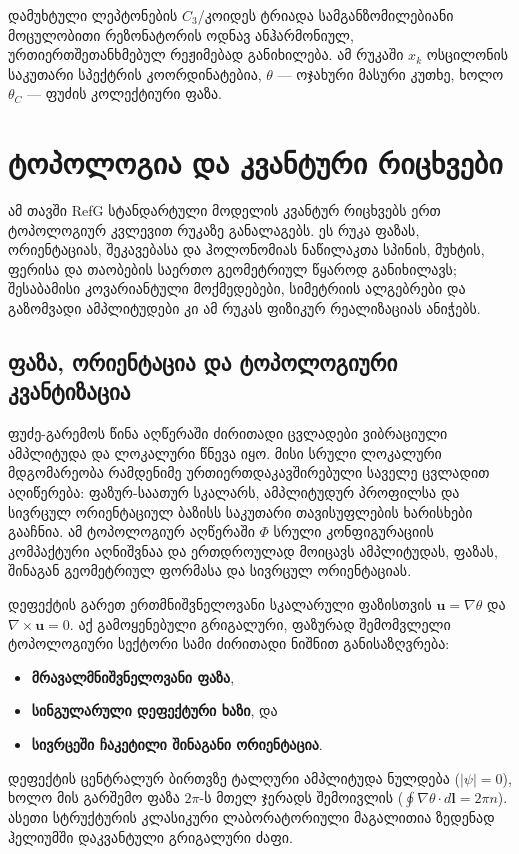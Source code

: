 \documentclass[11pt,a4paper]{article}
\begin{document}
დამუხტული ლეპტონების $C_3$/კოიდეს ტრიადა სამგანზომილებიანი მოცულობითი რეზონატორის ოდნავ ანჰარმონიულ, ურთიერთშეთანხმებულ რეჟიმებად განიხილება. ამ რუკაში $x_k$ ოსცილონის საკუთარი სპექტრის კოორდინატებია, $\theta$ — ოჯახური მასური კუთხე, ხოლო $\theta_C$ — ფუძის კოლექტიური ფაზა.


\section{ტოპოლოგია და კვანტური რიცხვები}

ამ თავში RefG სტანდარტული მოდელის კვანტურ რიცხვებს ერთ ტოპოლოგიურ კვლევით რუკაზე განალაგებს. ეს რუკა ფაზას, ორიენტაციას, შეკავებასა და ჰოლონომიას ნაწილაკთა სპინის, მუხტის, ფერისა და თაობების საერთო გეომეტრიულ წყაროდ განიხილავს; შესაბამისი კოვარიანტული მოქმედებები, სიმეტრიის ალგებრები და გაზომვადი ამპლიტუდები კი ამ რუკას ფიზიკურ რეალიზაციას ანიჭებს.

\subsection{ფაზა, ორიენტაცია და ტოპოლოგიური კვანტიზაცია}

ფუძე-გარემოს წინა აღწერაში ძირითადი ცვლადები ვიბრაციული ამპლიტუდა და ლოკალური წნევა იყო. მისი სრული ლოკალური მდგომარეობა რამდენიმე ურთიერთდაკავშირებული საველე ცვლადით აღიწერება: ფაზურ-საათურ სკალარს, ამპლიტუდურ პროფილსა და სივრცულ ორიენტაციულ ბაზისს საკუთარი თავისუფლების ხარისხები გააჩნია. ამ ტოპოლოგიურ აღწერაში $\Phi$ სრული კონფიგურაციის კომპაქტური აღნიშვნაა და ერთდროულად მოიცავს ამპლიტუდას, ფაზას, შინაგან გეომეტრიულ ფორმასა და სივრცულ ორიენტაციას.

დეფექტის გარეთ ერთმნიშვნელოვანი სკალარული ფაზისთვის $\mathbf{u}=\nabla\theta$ და $\nabla\times\mathbf{u}=0$. აქ გამოყენებული გრიგალური, ფაზურად შემომვლელი ტოპოლოგიური სექტორი სამი ძირითადი ნიშნით განისაზღვრება:

\begin{itemize}
\item \textbf{მრავალმნიშვნელოვანი ფაზა},
\item \textbf{სინგულარული დეფექტური ხაზი}, და
\item \textbf{სივრცეში ჩაკეტილი შინაგანი ორიენტაცია}.

\end{itemize}
დეფექტის ცენტრალურ ბირთვზე ტალღური ამპლიტუდა ნულდება ($|\psi| = 0$), ხოლო მის გარშემო ფაზა $2\pi$-ს მთელ ჯერადს შემოივლის ($\oint \nabla\theta \cdot d\mathbf{l} = 2\pi n$). ასეთი სტრუქტურის კლასიკური ლაბორატორიული მაგალითია ზედენად ჰელიუმში დაკვანტული გრიგალური ძაფი.
\end{document}
